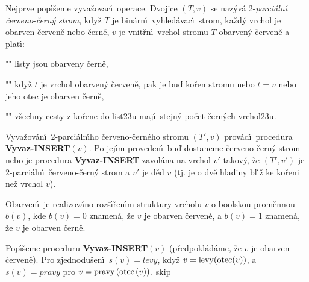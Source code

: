 \flushpar Nejprve pop\'\i\v seme vyva\v zovac\'\i\ operace. 
Dvojice $\left(T,v\right)$ se naz\'yv\'a 2-\emph{parci\'aln\'\i}
\emph{\v cerveno}-\emph{\v cern\'y} \emph{strom}, kdy\v z $T$ je 
bin\'arn\'\i\ vyhled\'avac\'\i\ strom, ka\v zd\'y vrchol je obarven 
\v cerven\v e nebo \v cern\v e, $v$ je 
vnit\v rn\'\i\ vrchol stromu $T$ obarven\'y \v cerven\v e a plat\'\i :
\roster
\item"{}"
listy jsou obarveny \v cern\v e,
\item"{}"
kdy\v z $t$ je vrchol obarven\'y \v cerven\v e, pak je bu\v d ko\v ren 
stromu nebo $t=v$ nebo jeho otec je obarven \v cern\v e,
\item"{}"
v\v sechny cesty z ko\v rene do list\accent23u maj\'\i\ stejn\'y 
po\v cet \v cer\-n\'ych vrchol\accent23u.
\endroster
\medskip

\flushpar Vyva\v zov\'an\'\i\ 2-parci\'aln\'\i ho \v cerveno-\v cern\'eho stromu $\left(T',v\right)$ 
pro\-v\'a\-d\'\i\ procedura {\bf Vyvaz-IN\-SERT$\left(v\right)$}.  Po jej\'\i m 
proveden\'\i\ bu\v d do\-sta\-neme \v cer\-ve\-no-\v cern\'y strom nebo 
je procedura {\bf Vyvaz-IN\-SERT} zavol\'ana na vrchol $
v'$ takov\'y, 
\v ze $\left(T',v'\right)$ je 2-parci\'aln\'\i\ \v cerve\-no-\v cern\'y strom a $
v'$ je d\v ed $v$ 
(tj.  je o dv\v e hladiny bl\'\i\v z ke ko\v reni ne\v z vrchol $
v$). 
\medskip

\flushpar Obarven\'\i\ je realizov\'ano roz\v s\'\i\v ren\'\i m struktury vrcholu $v$ 
o boolskou prom\v ennou $b\left(v\right)$, kde $b\left(v\right)=0$ znamen\'a, \v ze $v$ je obarven 
\v cerven\v e, a $b\left(v\right)=1$ znamen\'a, \v ze $v$ je obarven \v cern\v e.
\medskip

\flushpar Pop\'\i\v seme proceduru {\bf Vyvaz-INSERT$\left(v\right)$} (p\v redpokl\'ad\'ame, \v ze 
$v$ je obarven \v cerven\v e). Pro zjednodu\v sen\'\i\ $s(v)=levy$, kdy\v z $v=\operatorname{levy}(\operatorname{otec}(v))$, a $s(v)=pravy$ pro  
$v=\operatorname{pravy}\left(\operatorname{otec}\left(v\right)\right)$.
skip

